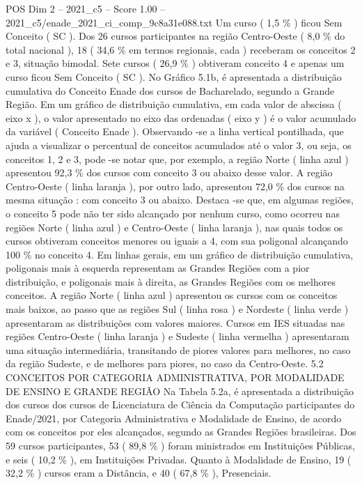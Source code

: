 \begin{textsample}{POS Dim 2 – 2021\_c5 – Score 1.00 – 2021\_c5/enade\_2021\_ci\_comp\_9c8a31e088.txt}
Um curso ( 1,5 \% ) ficou Sem Conceito ( SC ).
Dos 26 cursos participantes na região Centro-Oeste ( 8,0 \% do total nacional ), 18 ( 34,6 \% em termos regionais, cada ) receberam os conceitos 2 e 3, situação bimodal.
Sete cursos ( 26,9 \% ) obtiveram conceito 4 e apenas um curso ficou Sem Conceito ( SC ).
No Gráfico 5.1b, é apresentada a distribuição cumulativa do Conceito Enade dos cursos de Bacharelado, segundo a Grande Região.
Em um gráfico de distribuição cumulativa, em cada valor de abscissa ( eixo x ), o valor apresentado no eixo das ordenadas ( eixo y ) é o valor acumulado da variável ( Conceito Enade ).
Observando -se a linha vertical pontilhada, que ajuda a visualizar o percentual de conceitos acumulados até o valor 3, ou seja, os conceitos 1, 2 e 3, pode -se notar que, por exemplo, a região Norte ( linha azul ) apresentou 92,3 \% dos cursos com conceito 3 ou abaixo desse valor.
A região Centro-Oeste ( linha laranja ), por outro lado, apresentou 72,0 \% dos cursos na mesma situação : com conceito 3 ou abaixo.
Destaca -se que, em algumas regiões, o conceito 5 pode não ter sido alcançado por nenhum curso, como ocorreu nas regiões Norte ( linha azul ) e Centro-Oeste ( linha laranja ), nas quais todos os cursos obtiveram conceitos menores ou iguais a 4, com sua poligonal alcançando 100 \% no conceito 4.
Em linhas gerais, em um gráfico de distribuição cumulativa, poligonais mais à esquerda representam as Grandes Regiões com a pior distribuição, e poligonais mais à direita, as Grandes Regiões com os melhores conceitos.
A região Norte ( linha azul ) apresentou os cursos com os conceitos mais baixos, ao passo que as regiões Sul ( linha rosa ) e Nordeste ( linha verde ) apresentaram as distribuições com valores maiores.
Cursos em IES situadas nas regiões Centro-Oeste ( linha laranja ) e Sudeste ( linha vermelha ) apresentaram uma situação intermediária, transitando de piores valores para melhores, no caso da região Sudeste, e de melhores para piores, no caso da Centro-Oeste. 5.2 CONCEITOS POR CATEGORIA ADMINISTRATIVA, POR MODALIDADE DE ENSINO E GRANDE REGIÃO Na Tabela 5.2a, é apresentada a distribuição dos cursos dos cursos de Licenciatura de Ciência da Computação participantes do Enade/2021, por Categoria Administrativa e Modalidade de Ensino, de acordo com os conceitos por eles alcançados, segundo as Grandes Regiões brasileiras.
Dos 59 cursos participantes, 53 ( 89,8 \% ) foram ministrados em Instituições Públicas, e seis ( 10,2 \% ), em Instituições Privadas.
Quanto à Modalidade de Ensino, 19 ( 32,2 \% ) cursos eram a Distância, e 40 ( 67,8 \% ), Presenciais.

\end{textsample}
